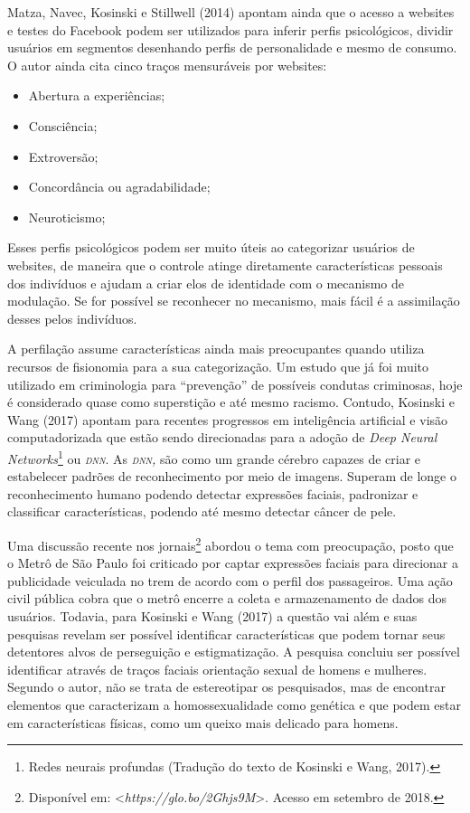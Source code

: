 Matza, Navec, Kosinski e Stillwell (2014) apontam ainda que o acesso a
websites e testes do Facebook podem ser utilizados para inferir perfis
psicológicos, dividir usuários em segmentos desenhando perfis de
personalidade e mesmo de consumo. O autor ainda cita cinco traços
mensuráveis por websites:

\begin{itemize}
\item
  Abertura a experiências;
\item
  Consciência;
\item
  Extroversão;
\item
  Concordância ou agradabilidade;
\item
  Neuroticismo;
\end{itemize}

Esses perfis psicológicos podem ser muito úteis ao categorizar usuários
de websites, de maneira que o controle atinge diretamente
características pessoais dos indivíduos e ajudam a criar elos de
identidade com o mecanismo de modulação. Se for possível se reconhecer
no mecanismo, mais fácil é a assimilação desses pelos indivíduos.

A perfilação assume características ainda mais preocupantes quando
utiliza recursos de fisionomia para a sua categorização. Um estudo que
já foi muito utilizado em criminologia para ``prevenção'' de possíveis
condutas criminosas, hoje é considerado quase como superstição e até
mesmo racismo. Contudo, Kosinski e Wang (2017) apontam para recentes
progressos em inteligência artificial e visão computadorizada que estão
sendo direcionadas para a adoção de \emph{Deep Neural
Networks}\footnote{Redes neurais profundas (Tradução do texto de
  Kosinski e Wang, 2017).} ou \emph{\textsc{dnn}}. As \emph{\textsc{dnn},} são como um
grande cérebro capazes de criar e estabelecer padrões de reconhecimento
por meio de imagens. Superam de longe o reconhecimento humano podendo
detectar expressões faciais, padronizar e classificar características,
podendo até mesmo detectar câncer de pele.

Uma discussão recente nos jornais\footnote{Disponível em:
\textless{}\emph{https://glo.bo/2Ghjs9M}\textgreater{}. Acesso em setembro de 2018.} abordou o tema com preocupação, posto que
o Metrô de São Paulo foi criticado por captar expressões faciais para
direcionar a publicidade veiculada no trem de acordo com o perfil dos
passageiros. Uma ação civil pública cobra que o metrô encerre a coleta e
armazenamento de dados dos usuários. Todavia, para Kosinski e Wang (2017)
a questão vai além e suas pesquisas revelam ser possível identificar
características que podem tornar seus detentores alvos de perseguição e
estigmatização. A pesquisa concluiu ser possível identificar através de
traços faciais orientação sexual de homens e mulheres. Segundo o autor,
não se trata de estereotipar os pesquisados, mas de encontrar elementos
que caracterizam a homossexualidade como genética e que podem estar em
características físicas, como um queixo mais delicado para homens.

